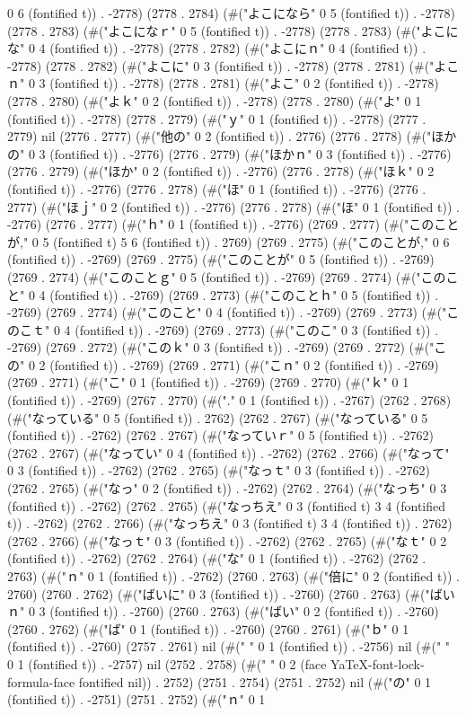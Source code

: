 0 6 (fontified t)) . -2778) (2778 . 2784) (#("よこになら" 0 5 (fontified t)) . -2778) (2778 . 2783) (#("よこになｒ" 0 5 (fontified t)) . -2778) (2778 . 2783) (#("よこにな" 0 4 (fontified t)) . -2778) (2778 . 2782) (#("よこにｎ" 0 4 (fontified t)) . -2778) (2778 . 2782) (#("よこに" 0 3 (fontified t)) . -2778) (2778 . 2781) (#("よこｎ" 0 3 (fontified t)) . -2778) (2778 . 2781) (#("よこ" 0 2 (fontified t)) . -2778) (2778 . 2780) (#("よｋ" 0 2 (fontified t)) . -2778) (2778 . 2780) (#("よ" 0 1 (fontified t)) . -2778) (2778 . 2779) (#("ｙ" 0 1 (fontified t)) . -2778) (2777 . 2779) nil (2776 . 2777) (#("他の" 0 2 (fontified t)) . 2776) (2776 . 2778) (#("ほかの" 0 3 (fontified t)) . -2776) (2776 . 2779) (#("ほかｎ" 0 3 (fontified t)) . -2776) (2776 . 2779) (#("ほか" 0 2 (fontified t)) . -2776) (2776 . 2778) (#("ほｋ" 0 2 (fontified t)) . -2776) (2776 . 2778) (#("ほ" 0 1 (fontified t)) . -2776) (2776 . 2777) (#("ほｊ" 0 2 (fontified t)) . -2776) (2776 . 2778) (#("ほ" 0 1 (fontified t)) . -2776) (2776 . 2777) (#("ｈ" 0 1 (fontified t)) . -2776) (2769 . 2777) (#("このことが," 0 5 (fontified t) 5 6 (fontified t)) . 2769) (2769 . 2775) (#("このことが," 0 6 (fontified t)) . -2769) (2769 . 2775) (#("このことが" 0 5 (fontified t)) . -2769) (2769 . 2774) (#("このことｇ" 0 5 (fontified t)) . -2769) (2769 . 2774) (#("このこと" 0 4 (fontified t)) . -2769) (2769 . 2773) (#("このことｈ" 0 5 (fontified t)) . -2769) (2769 . 2774) (#("このこと" 0 4 (fontified t)) . -2769) (2769 . 2773) (#("このこｔ" 0 4 (fontified t)) . -2769) (2769 . 2773) (#("このこ" 0 3 (fontified t)) . -2769) (2769 . 2772) (#("このｋ" 0 3 (fontified t)) . -2769) (2769 . 2772) (#("この" 0 2 (fontified t)) . -2769) (2769 . 2771) (#("こｎ" 0 2 (fontified t)) . -2769) (2769 . 2771) (#("こ" 0 1 (fontified t)) . -2769) (2769 . 2770) (#("ｋ" 0 1 (fontified t)) . -2769) (2767 . 2770) (#("." 0 1 (fontified t)) . -2767) (2762 . 2768) (#("なっている" 0 5 (fontified t)) . 2762) (2762 . 2767) (#("なっている" 0 5 (fontified t)) . -2762) (2762 . 2767) (#("なっていｒ" 0 5 (fontified t)) . -2762) (2762 . 2767) (#("なってい" 0 4 (fontified t)) . -2762) (2762 . 2766) (#("なって" 0 3 (fontified t)) . -2762) (2762 . 2765) (#("なっｔ" 0 3 (fontified t)) . -2762) (2762 . 2765) (#("なっ" 0 2 (fontified t)) . -2762) (2762 . 2764) (#("なっち" 0 3 (fontified t)) . -2762) (2762 . 2765) (#("なっちえ" 0 3 (fontified t) 3 4 (fontified t)) . -2762) (2762 . 2766) (#("なっちえ" 0 3 (fontified t) 3 4 (fontified t)) . 2762) (2762 . 2766) (#("なっｔ" 0 3 (fontified t)) . -2762) (2762 . 2765) (#("なｔ" 0 2 (fontified t)) . -2762) (2762 . 2764) (#("な" 0 1 (fontified t)) . -2762) (2762 . 2763) (#("ｎ" 0 1 (fontified t)) . -2762) (2760 . 2763) (#("倍に" 0 2 (fontified t)) . 2760) (2760 . 2762) (#("ばいに" 0 3 (fontified t)) . -2760) (2760 . 2763) (#("ばいｎ" 0 3 (fontified t)) . -2760) (2760 . 2763) (#("ばい" 0 2 (fontified t)) . -2760) (2760 . 2762) (#("ば" 0 1 (fontified t)) . -2760) (2760 . 2761) (#("ｂ" 0 1 (fontified t)) . -2760) (2757 . 2761) nil (#(" " 0 1 (fontified t)) . -2756) nil (#(" " 0 1 (fontified t)) . -2757) nil (2752 . 2758) (#("  " 0 2 (face YaTeX-font-lock-formula-face fontified nil)) . 2752) (2751 . 2754) (2751 . 2752) nil (#("の" 0 1 (fontified t)) . -2751) (2751 . 2752) (#("ｎ" 0 1 